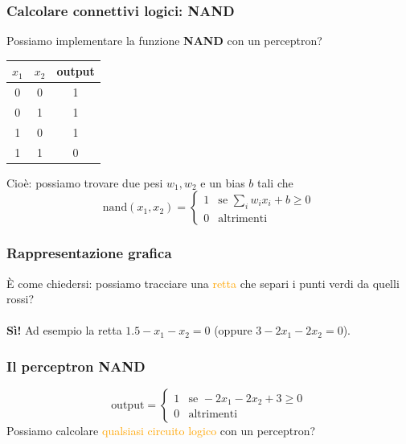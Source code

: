 \documentclass[a4paper,12pt]{article}
\newcommand{\x}{\bm{x}}
\newcommand{\hl}[1]{\textcolor{orange}{#1}}
\begin{document}
\subsubsection{Calcolare connettivi logici: NAND}
Possiamo implementare la funzione \textbf{NAND} con un perceptron?
\begin{center}
\begin{tabular}{cc|c}
$x_1$ & $x_2$ & output \\ \hline
0 & 0 & 1 \\
0 & 1 & 1 \\
1 & 0 & 1 \\
1 & 1 & 0
\end{tabular}
\end{center}
Cioè: possiamo trovare due pesi $w_1, w_2$ e un bias $b$ tali che
\[ \text{nand}(x_1,x_2) = \begin{cases} 1 & \text{se } \sum_i w_i x_i + b \ge 0 \\ 0 & \text{altrimenti} \end{cases} \]
\subsubsection*{Rappresentazione grafica}
È come chiedersi: possiamo tracciare una \hl{retta} che separi i punti verdi da quelli rossi?\\
\vspace{1px}\\
\textbf{Sì!} Ad esempio la retta $1.5 - x_1 - x_2 = 0$ (oppure $3 - 2x_1 - 2x_2 = 0$).
\begin{center}
\end{center}
\subsubsection*{Il perceptron NAND}
\[ \text{output} = \begin{cases} 1 & \text{se } -2x_1 - 2x_2 + 3 \ge 0 \\ 0 & \text{altrimenti} \end{cases} \]
Possiamo calcolare \hl{qualsiasi circuito logico} con un perceptron?
\end{document}
